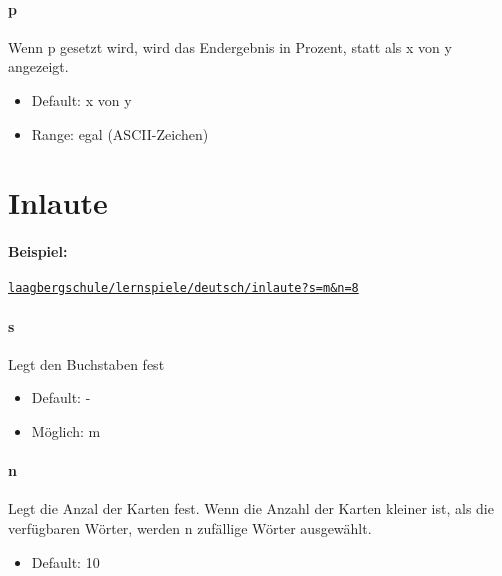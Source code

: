 \documentclass[]{article}
\begin{document}
\begin{multicols}{2}
	\paragraph{p}  Wenn p gesetzt wird, wird das Endergebnis in Prozent, statt als x von y angezeigt.
	\begin{itemize}
		\item Default:  x von y
		\item Range:  egal (ASCII-Zeichen)
	\end{itemize}

	\end{multicols}

\section{Inlaute}

\paragraph{Beispiel:}
\texttt{\href{laagbergschule/lernspiele/deutsch/inlaute?s=m\&n=8}{laagbergschule/lernspiele/deutsch/inlaute?s=m\&n=8}} \\
\begin{multicols}{2}

	\paragraph{s}  Legt den Buchstaben fest
	\begin{itemize}
		\item Default: -
		\item Möglich: m
	\end{itemize}

	\paragraph{n} Legt die Anzal der Karten fest. Wenn die Anzahl der Karten kleiner ist, als die verfügbaren Wörter, werden n zufällige Wörter ausgewählt.
	\begin{itemize}
		\item Default: 10
	\end{itemize}
\end{multicols}
\end{document}
